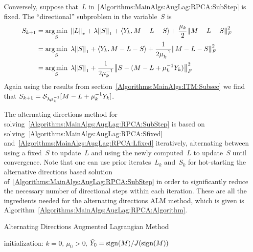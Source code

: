 Conversely, suppose that~$L$ in~\eqref{Algorithms:MainAlgs:AugLag:RPCA:SubStep} is fixed. The ``directional'' subproblem in the variable~$S$ is
%
\begin{align}
\begin{split}
S_{k+1} &= \operatorname*{arg\,min}_{S} \; {\left\|L\right\|}_{*}^{} + \lambda {\left\|S\right\|}_{1}^{} + \langle Y_k, M-L-S \rangle + \frac{\mu_k}{2} {\left\|M-L-S\right\|}_{F}^{2} \\
&= \operatorname*{arg\,min}_{S} \; \lambda {\left\|S\right\|}_{1}^{} + \langle Y_k, M-L-S \rangle + \frac{1}{2\mu_k^{-1}} {\left\|M-L-S\right\|}_{F}^{2} \\
&= \operatorname*{arg\,min}_{S} \; \lambda {\left\|S\right\|}_{1}^{} + \frac{1}{2\mu_k^{-1}} {\left\|S-(M-L+\mu_k^{-1}Y_k)\right\|}_{F}^{2} 
\end{split}
\label{Algorithms:MainAlgs:AugLag:RPCA:Lfixed}
\end{align}
%
Again using the results from section~\ref{Algorithms:MainAlgs:ITM:Subsec} we find that $S_{k+1} = {\mathcal{S}}_{\lambda\mu_k^{-1}}[M-L+\mu_k^{-1}Y_k]$. 

The alternating directions method for solving~\eqref{Algorithms:MainAlgs:AugLag:RPCA:SubStep} is based on solving~\eqref{Algorithms:MainAlgs:AugLag:RPCA:Sfixed} and~\eqref{Algorithms:MainAlgs:AugLag:RPCA:Lfixed} iteratively, alternating between using a fixed~$S$ to update~$L$ and using the newly computed~$L$ to update~$S$ until convergence. Note that one can use prior iterates~$L_k$ and~$S_k$ for hot-starting the alternative directions based solution of~\eqref{Algorithms:MainAlgs:AugLag:RPCA:SubStep} in order to significantly reduce the necessary number of directional steps within each iteration. These are all the ingredients needed for the alternating directions ALM method, which is given is Algorithm~\ref{Algorithms:MainAlgs:AugLag:RPCA:Algorithm}.

\begin{algorithm}
\caption{Alternating Directions Augmented Lagrangian Method}
initialization: $k=0$, $\mu_0>0$, ${\hat{Y}}_0 = \operatorname{sign}(M)/J(\operatorname{sign}(M))$\;
\label{Algorithms:MainAlgs:AugLag:RPCA:Algorithm}
\end{algorithm}

